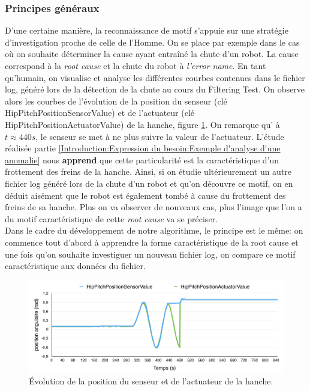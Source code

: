 \subsubsection{Principes généraux}
\label{Automatisation du processus d'investigation: Reconnaissance de motifs: Principes généraux}
D'une certaine manière, la reconnaissance de motif s'appuie sur une stratégie d'investigation proche de celle de l'Homme. On se place par exemple dans le cas où on souhaite déterminer la cause ayant entraîné la chute d'un robot. La cause correspond à la \emph{root cause} et la chute du robot à \emph{l'error name}. En tant qu'humain, on visualise et analyse les différentes courbes contenues dans le fichier log, généré lors de la détection de la chute au cours du Filtering Test. On observe alors les courbes de l'évolution de la position du senseur (clé HipPitchPositionSensorValue) et de l'actuateur (clé HipPitchPositionActuatorValue) de la hanche, figure \ref{fig:Évolution de la position du senseur et de l'actuateur de la hanche}. On remarque qu' à $t \approx 440 s$, le senseur se met à ne plus suivre la valeur de l'actuateur. L'étude réalisée partie \ref{Introduction:Expression du besoin:Exemple d'analyse d'une anomalie} nous \textbf{apprend} que cette particularité est la caractéristique d'un frottement des freins de la hanche. Ainsi, si on étudie ultérieurement un autre fichier log généré lors de la chute d'un robot et qu'on découvre ce motif, on en déduit aisément que le robot est également tombé à cause du frottement des freins de sa hanche. Plus on va observer de nouveaux cas, plus l'image que l'on a du motif caractéristique de cette \emph{root cause} va se préciser.\\
Dans le cadre du développement de notre algorithme, le principe est le même: on commence tout d'abord à apprendre la forme caractéristique de la root cause et une fois qu'on souhaite investiguer un nouveau fichier log, on compare ce motif caractéristique aux données du fichier. 

\begin{figure}[H]
	\centering\includegraphics[width=12cm]{images/HipPitch.png}
	\caption[Évolution de la position du senseur et de l'actuateur de la hanche]{Évolution de la position du senseur et de l'actuateur de la hanche.}
	\label{fig:Évolution de la position du senseur et de l'actuateur de la hanche}
\end{figure}

